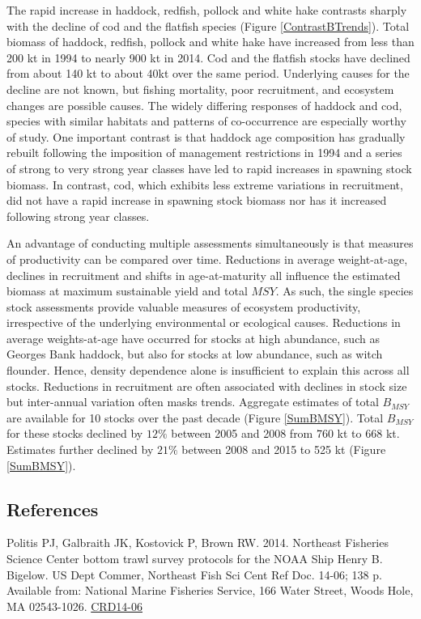 The rapid increase in haddock, redfish, pollock and white hake contrasts sharply with the decline of cod and the flatfish species (Figure \ref{ContrastBTrends}). Total biomass of haddock, redfish, pollock and white hake have increased from less than 200 kt in 1994 to nearly 900 kt in 2014. Cod and the flatfish stocks have declined from about 140 kt to about 40kt  over the same period. Underlying causes for the decline are not known, but fishing mortality, poor recruitment, and ecosystem changes are possible causes. The widely differing responses of haddock and cod, species with similar habitats and patterns of co-occurrence are especially worthy of study.  One important contrast is that haddock age composition has gradually rebuilt following the imposition of management restrictions in 1994 and a series of strong to very strong year classes have led to rapid increases in spawning stock biomass.  In contrast, cod, which exhibits less extreme variations in recruitment, did not have a rapid increase in spawning stock biomass nor has it increased following strong year classes. 

An advantage of conducting multiple assessments simultaneously is that measures of productivity can be compared over time. Reductions in average weight-at-age, declines in recruitment and shifts in age-at-maturity all influence the estimated biomass at maximum sustainable yield and total $MSY$.  As such, the single species stock assessments provide valuable measures of ecosystem productivity, irrespective of the underlying environmental or ecological causes.   Reductions in average weights-at-age have occurred for stocks at  high  abundance, such as Georges Bank haddock, but also for stocks at low abundance, such as witch flounder.  Hence, density dependence alone is  insufficient to explain this across all stocks.  Reductions in recruitment are often associated with declines in stock size but inter-annual variation often masks trends.  Aggregate estimates of total $B_{MSY}$ are available for 10 stocks over the past decade (Figure \ref{SumBMSY}).  Total $B_{MSY}$ for these stocks declined by $12\%$ between 2005 and  2008 from 760 kt to 668 kt.  Estimates further declined by $21\%$ between 2008 and 2015 to 525 kt (Figure \ref{SumBMSY}). 

\subsection*{References}
Politis PJ, Galbraith JK, Kostovick P, Brown RW. 2014. Northeast Fisheries Science Center bottom trawl survey protocols for the NOAA Ship Henry B. Bigelow. US Dept Commer, Northeast Fish Sci Cent Ref Doc. 14-06; 138 p. Available from: National Marine Fisheries Service, 166 Water Street, Woods Hole, MA 02543-1026. \href{http://nefsc.noaa.gov/publications/}{CRD14-06}


